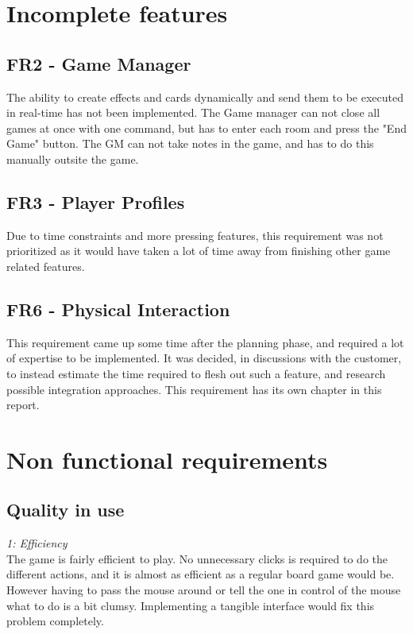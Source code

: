 \section{Incomplete features}


\subsection{FR2 - Game Manager}
The ability to create effects and cards dynamically and send them to be executed in real-time has not been implemented. The Game manager can not close all games at once with one command, but has to enter each room and press the "End Game" button. The GM can not take notes in the game, and has to do this manually outsite the game.\\

\subsection{FR3 - Player Profiles}
Due to time constraints and more pressing features, this requirement was not prioritized as it would have taken a lot of time away from finishing other game related features.\\

\subsection{FR6 - Physical Interaction}
This requirement came up some time after the planning phase, and required a lot of expertise to be implemented. It was decided, in discussions with the customer, to instead estimate the time required to flesh out such a feature, and research possible integration approaches. This requirement has its own chapter in this report.\\
\section{Non functional requirements} 

\subsection{Quality in use}

\emph{1: Efficiency}\\
The game is fairly efficient to play. No unnecessary clicks is required to do the different actions, and it is almost as efficient as a regular board game would be. However having to pass the mouse around or tell the one in control of the mouse what to do is a bit clumsy. Implementing a tangible interface would fix this problem completely.\\


